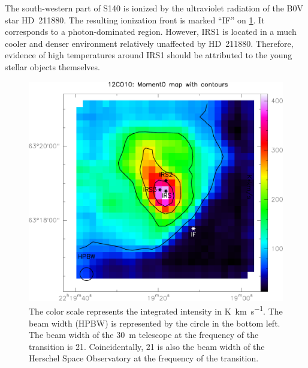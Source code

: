 The south-western part of S140 is ionized by the ultraviolet radiation of the B0V star HD~211880.
The resulting ionization front is marked ``IF'' on \cref{fig:12CO10_moment0}.
It corresponds to a  photon-dominated region.
However, IRS1 is located in a much cooler and denser environment relatively unaffected by HD~211880.
Therefore, evidence of high temperatures around IRS1 should be attributed to the young stellar objects themselves.
\begin{figure}[hbtp]
    \centering
    \includegraphics[width=\textwidth]{12CO10_moment0}
    \caption{Map of  around S140 IRS1, taken by the \SI{30}{\meter} telescope of IRAM. Credit E. Koumpia.}
    \caption*{
        The color scale represents the integrated intensity in \si{\kelvin \kilo\meter \per \second}.
        The beam width (HPBW) is represented by the circle in the bottom left.
        The beam width of the \SI{30}{\meter} telescope at the frequency of the  transition is \SI{21}{\arcsec}.
        Coincidentally, \SI{21}{\arcsec} is also the beam width of the Herschel Space Observatory at the frequency of the  transition.
    }
    \label{fig:12CO10_moment0}
\end{figure}

